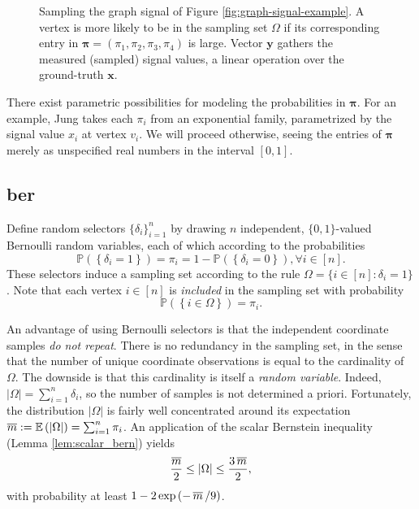 \begin{figure}[H]
    \centering
    
    \caption[Sampling the graph signal]{Sampling the graph signal of Figure \ref{fig:graph-signal-example}. A vertex is more likely to be in the sampling set $\Omega$ if its corresponding entry in $\bm{\pi} = \left( \pi_1, \pi_2, \pi_3, \pi_4 \right)$ is large. Vector $\mathbf{y}$ gathers the measured (sampled) signal values, a linear operation over the ground-truth $\mathbf{x}$.}
    \label{fig:sampling-graph-signal-example}
\end{figure}

There exist parametric possibilities for modeling the probabilities in $\bm{\pi}$. For an example, Jung \cite{jung2018} takes each $\pi_i$ from an exponential family, parametrized by the signal value $x_i$ at vertex $v_i$. We will proceed otherwise, seeing the entries of $\bm{\pi}$ merely as unspecified real numbers in the interval $[0,1]$.


\subsection{\texorpdfstring{\acrfull{ber}}{Bernoulli Sampling Model}}\label{sec:ber}

Define random selectors $\{ \delta_i \}_{i=1}^n$ by drawing $n$ independent, $\{0, 1\}$-valued Bernoulli random variables, each of which according to the probabilities
\begin{equation}
    \mathbb{P} \left ( \left \{  \delta_i = 1 \right \}\right ) = \pi_i = 1 - \mathbb{P} \left ( \left \{  \delta_i = 0 \right \}\right ), \forall i \in [n].
\end{equation}
These selectors induce a sampling set according to the rule $\Omega = \{ i \in [n] : \delta_i = 1\}$. Note that each vertex $i \in [n]$ is \emph{included} in the sampling set with probability
\begin{equation*}
    \mathbb{P} \left ( \left \{  i \in \Omega \right \}\right ) = \pi_i.
\end{equation*}

An advantage of using Bernoulli selectors is that the independent coordinate samples \emph{do not repeat}. There is no redundancy in the sampling set, in the sense that the number of unique coordinate observations is equal to the cardinality of $\Omega$. The downside is that this cardinality is itself a \emph{random variable}. Indeed, $|\Omega| = \sum_{i=1}^{n} \delta_i$, so the number of samples is not determined a priori. Fortunately, the distribution $|\Omega|$ is fairly well concentrated around its expectation $\mathop{\overline{m}} := \mathbb{E} \left ( |\Omega| \right ) = \sum_{i=1}^{n} \pi_i$. An application of the scalar Bernstein inequality (Lemma \ref{lem:scalar_bern}) yields
\begin{equation}
    \frac{\mathop{\overline{m}}}{2} \leq |\Omega| \leq \frac{3 \mathop{\overline{m}}}{2},
\end{equation}
with probability at least $1 - 2 \exp \left ( -  \mathop{\overline{m}} / 9 \right )$.

